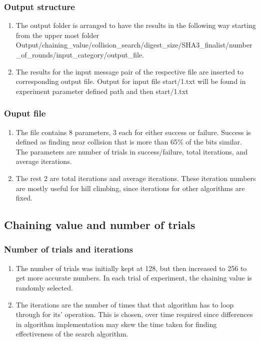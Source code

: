 \documentclass{beamer}
\begin{document}
\begin{frame}
\frametitle{Output structure}
\begin{enumerate}
\item The output folder is arranged to have the results in the following way starting from the upper most
folder 
Output/chaining\_value/collision\_search/digest\_size/SHA3\_finalist/number\_of\_rounds/input\_category/output\_file.
\item The results for the input message pair of the respective file are inserted to corresponding output file.
Output for input file start/1.txt will be found in experiment parameter defined path and then start/1.txt
\end{enumerate}
\end{frame}

\begin{frame}
\frametitle{Ouput file}
\begin{enumerate}
\item The file contains 8 parameters, 3 each for either success or failure. Success is defined as finding near 
collision that is more than 65\% of the bits similar. The parameters are number of trials in success/failure,
total iterations, and average iterations.
\item The rest 2 are total iterations and average iterations. These iteration numbers are mostly useful for
hill climbing, since iterations for other algorithms are fixed.
\end{enumerate}
\end{frame}

\subsection{Chaining value and number of trials}

\begin{frame}
\frametitle{Number of trials and iterations}
\begin{enumerate}
\item The number of trials was initially kept at 128, but then increased to 256 to get more accurate numbers.
In each trial of experiment, the chaining value is randomly selected.
\item The iterations are the number of times that that algorithm has to loop through for its' operation. This is
chosen, over time required since differences in algorithm implementation may skew the time taken for finding
effectiveness of the search algorithm.
\end{enumerate}
\end{frame}
\end{document}
